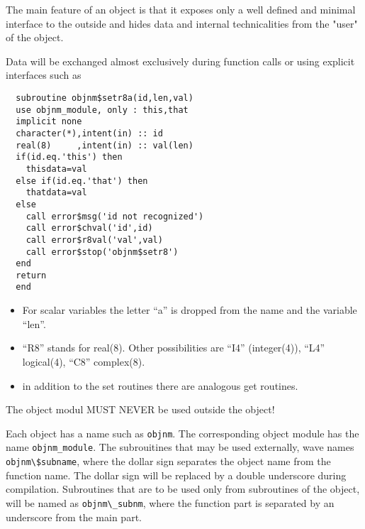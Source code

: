 \documentclass[11pt,a4paper]{report}
\begin{document}
The main feature of an object is that it exposes only a well defined and
 minimal interface to the outside and hides data and internal
 technicalities from the "user" of the object. 

Data will be exchanged almost exclusively during function calls or
 using explicit interfaces such as
\begin{verbatim}
  subroutine objnm$setr8a(id,len,val)
  use objnm_module, only : this,that
  implicit none
  character(*),intent(in) :: id
  real(8)     ,intent(in) :: val(len)
  if(id.eq.'this') then
    thisdata=val
  else if(id.eq.'that') then
    thatdata=val
  else
    call error$msg('id not recognized')
    call error$chval('id',id)
    call error$r8val('val',val)
    call error$stop('objnm$setr8')
  end
  return
  end
\end{verbatim}
\begin{itemize}
\item For scalar variables the letter ``a'' is dropped from the name and the
variable ``len''. 
%
\item ``R8'' stands for real(8). Other possibilities are ``I4''
  (integer(4)), ``L4'' logical(4), ``C8'' complex(8).
%
\item in addition to the set routines there are analogous get routines.
\end{itemize}

The object modul MUST NEVER be used outside the object!

Each object has a name such as \verb|objnm|. The corresponding object module
has the name \verb|objnm_module|. The subrouitines that may be used
externally, wave names \verb|objnm\$subname|, where the dollar sign
separates the object name from the function name. The dollar sign will
be replaced by a double underscore during compilation. Subroutines
that are to be used only from subroutines of the object, will be named
as \verb|objnm\_subnm|, where the function part is separated by an
underscore from the main part.






\clearpage


\end{document}
